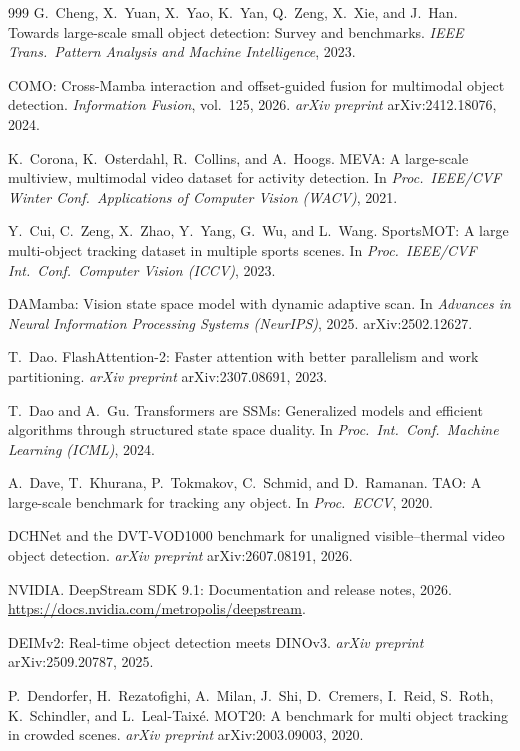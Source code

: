 \begin{thebibliography}{999}
G.~Cheng, X.~Yuan, X.~Yao, K.~Yan, Q.~Zeng, X.~Xie, and J.~Han.
Towards large-scale small object detection: Survey and benchmarks.
\textit{IEEE Trans.\ Pattern Analysis and Machine Intelligence}, 2023.

COMO: Cross-Mamba interaction and offset-guided fusion for multimodal object
detection. \textit{Information Fusion}, vol.~125, 2026.
\textit{arXiv preprint} arXiv:2412.18076, 2024.

K.~Corona, K.~Osterdahl, R.~Collins, and A.~Hoogs.
MEVA: A large-scale multiview, multimodal video dataset for activity detection.
In \textit{Proc.\ IEEE/CVF Winter Conf.\ Applications of Computer Vision (WACV)}, 2021.

Y.~Cui, C.~Zeng, X.~Zhao, Y.~Yang, G.~Wu, and L.~Wang.
SportsMOT: A large multi-object tracking dataset in multiple sports scenes.
In \textit{Proc.\ IEEE/CVF Int.\ Conf.\ Computer Vision (ICCV)}, 2023.

DAMamba: Vision state space model with dynamic adaptive scan.
In \textit{Advances in Neural Information Processing Systems (NeurIPS)}, 2025.
arXiv:2502.12627.

T.~Dao.
FlashAttention-2: Faster attention with better parallelism and work partitioning.
\textit{arXiv preprint} arXiv:2307.08691, 2023.

T.~Dao and A.~Gu.
Transformers are SSMs: Generalized models and efficient algorithms through
structured state space duality.
In \textit{Proc.\ Int.\ Conf.\ Machine Learning (ICML)}, 2024.

A.~Dave, T.~Khurana, P.~Tokmakov, C.~Schmid, and D.~Ramanan.
TAO: A large-scale benchmark for tracking any object.
In \textit{Proc.\ ECCV}, 2020.

DCHNet and the DVT-VOD1000 benchmark for unaligned visible--thermal video
object detection. \textit{arXiv preprint} arXiv:2607.08191, 2026.

NVIDIA.
DeepStream SDK 9.1: Documentation and release notes, 2026.
\url{https://docs.nvidia.com/metropolis/deepstream}.

DEIMv2: Real-time object detection meets DINOv3.
\textit{arXiv preprint} arXiv:2509.20787, 2025.

P.~Dendorfer, H.~Rezatofighi, A.~Milan, J.~Shi, D.~Cremers, I.~Reid, S.~Roth,
K.~Schindler, and L.~Leal-Taix\'e.
MOT20: A benchmark for multi object tracking in crowded scenes.
\textit{arXiv preprint} arXiv:2003.09003, 2020.


\end{thebibliography}
